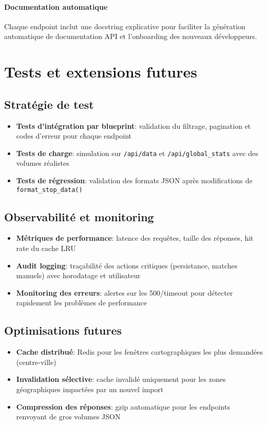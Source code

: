 \paragraph{Documentation automatique} Chaque endpoint inclut une docstring explicative pour faciliter la génération automatique de documentation API et l'onboarding des nouveaux développeurs.

\section{Tests et extensions futures}

\subsection*{Stratégie de test}
\begin{itemize}
  \item \textbf{Tests d'intégration par blueprint}: validation du filtrage, pagination et codes d'erreur pour chaque endpoint
  \item \textbf{Tests de charge}: simulation sur \texttt{/api/data} et \texttt{/api/global\_stats} avec des volumes réalistes
  \item \textbf{Tests de régression}: validation des formats JSON après modifications de \texttt{format\_stop\_data()}
\end{itemize}

\subsection*{Observabilité et monitoring}
\begin{itemize}
  \item \textbf{Métriques de performance}: latence des requêtes, taille des réponses, hit rate du cache LRU
  \item \textbf{Audit logging}: traçabilité des actions critiques (persistance, matches manuels) avec horodatage et utilisateur
  \item \textbf{Monitoring des erreurs}: alertes sur les 500/timeout pour détecter rapidement les problèmes de performance
\end{itemize}

\subsection*{Optimisations futures}
\begin{itemize}
  \item \textbf{Cache distribué}: Redis pour les fenêtres cartographiques les plus demandées (centre-ville)
  \item \textbf{Invalidation sélective}: cache invalidé uniquement pour les zones géographiques impactées par un nouvel import
  \item \textbf{Compression des réponses}: gzip automatique pour les endpoints renvoyant de gros volumes JSON
\end{itemize}

